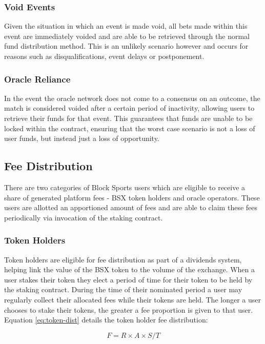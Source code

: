 \documentclass{article}
\begin{document}
		\subsubsection{Void Events}
Given the situation in which an event is made void, all bets made within this event are immediately voided and are able to be retrieved through the normal fund distribution method. This is an unlikely scenario however and occurs for reasons such as disqualifications, event delays or postponement.

		\subsubsection{Oracle Reliance}
In the event the oracle network does not come to a consensus on an outcome, the match is considered voided after a certain period of inactivity, allowing users to retrieve their funds for that event. This guarantees that funds are unable to be locked within the contract, ensuring that the worst case scenario is not a loss of user funds, but instead just a loss of opportunity.


	\subsection{Fee Distribution}
There are two categories of Block Sports users which are eligible to receive a share of generated platform fees - BSX token holders and oracle operators. These users are allotted an apportioned amount of fees and are able to claim these fees periodically via invocation of the staking contract. 

		\subsubsection{Token Holders}
Token holders are eligible for fee distribution as part of a dividends system, helping link the value of the BSX token to the volume of the exchange. When a user stakes their token they elect a period of time for their token to be held by the staking contract. During the time of their nominated period a user may regularly collect their allocated fees while their tokens are held. The longer a user chooses to stake their tokens, the greater a fee proportion is given to that user. Equation \ref{eq:token-dist} details the token holder fee distribution:

\begin{equation}
F = R\times A\times S/T\label{eq:token-dist}
\end{equation}
\end{document}
